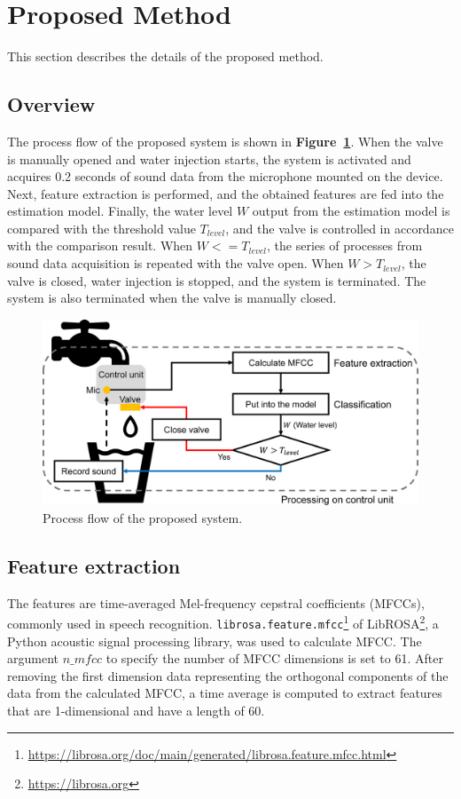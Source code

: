 \documentclass[sigconf,authordraft]{acmart}
\newcommand\figref[1]{\textbf{Figure~\ref{fig:#1}}}
\begin{document}
\section{Proposed Method}
\label{sec:method}
This section describes the details of the proposed method.

\subsection{Overview}
The process flow of the proposed system is shown in \figref{method}. When the valve is manually opened and water injection starts, the system is activated and acquires 0.2 seconds of sound data from the microphone mounted on the device. Next, feature extraction is performed, and the obtained features are fed into the estimation model. Finally, the water level $W$ output from the estimation model is compared with the threshold value $T_{level}$, and the valve is controlled in accordance with the comparison result. When $W<=T_{level}$, the series of processes from sound data acquisition is repeated with the valve open. When $W>T_{level}$, the valve is closed, water injection is stopped, and the system is terminated. The system is also terminated when the valve is manually closed.

\begin{figure}[!t]
  \centering
  \includegraphics[width=0.8\linewidth]{figures/method.eps}
  \caption{Process flow of the proposed system.}
  \label{fig:method}
\end{figure}


\subsection{Feature extraction}
The features are time-averaged Mel-frequency cepstral coefficients (MFCCs), commonly used in speech recognition. \texttt{librosa.feature.mfcc}\footnote{\url{https://librosa.org/doc/main/generated/librosa.feature.mfcc.html}} of LibROSA\footnote{\url{https://librosa.org}}, a Python acoustic signal processing library, was used to calculate MFCC. The argument $n\_mfcc$ to specify the number of MFCC dimensions is set to 61. After removing the first dimension data representing the orthogonal components of the data from the calculated MFCC, a time average is computed to extract features that are 1-dimensional and have a length of 60.
\end{document}
